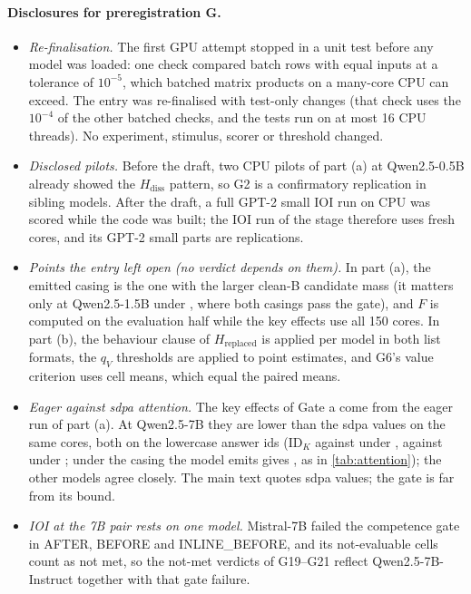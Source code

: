 \paragraph{Disclosures for preregistration G.}
\begin{itemize}\setlength\itemsep{1pt}
  \item \emph{Re-finalisation.} The first GPU attempt stopped in a unit test before any model was loaded: one check compared batch rows with equal inputs at a tolerance of $10^{-5}$, which batched matrix products on a many-core CPU can exceed. The entry was re-finalised with test-only changes (that check uses the $10^{-4}$ of the other batched checks, and the tests run on at most 16 CPU threads). No experiment, stimulus, scorer or threshold changed.
  \item \emph{Disclosed pilots.} Before the draft, two CPU pilots of part (a) at Qwen2.5-0.5B already showed the $H_{\mathrm{diss}}$ pattern, so G2 is a confirmatory replication in sibling models. After the draft, a full GPT-2 small IOI run on CPU was scored while the code was built; the IOI run of the stage therefore uses fresh cores, and its GPT-2 small parts are replications.
  \item \emph{Points the entry left open (no verdict depends on them).} In part (a), the emitted casing is the one with the larger clean-B candidate mass (it matters only at Qwen2.5-1.5B under \fmtPost{}, where both casings pass the gate), and $F$ is computed on the evaluation half while the key effects use all 150 cores. In part (b), the behaviour clause of $H_{\mathrm{replaced}}$ is applied per model in both list formats, the $q_V$ thresholds are applied to point estimates, and G6's value criterion uses cell means, which equal the paired means.
  \item \emph{Eager against sdpa attention.} The key effects of Gate a come from the eager run of part (a). At Qwen2.5-7B they are lower than the sdpa values on the same cores, both on the lowercase answer ids ($\mathrm{ID}_K$ \GaIDKLowPostQwenSeven{} against \GaSdpaIDKPostQwenSeven{} under \fmtPost{}, \GaIDKLowOptQwenSeven{} against \GaSdpaIDKOptQwenSeven{} under \fmtOpt{}; under \fmtPost{} the casing the model emits gives \GaIDKCapPostQwenSeven{}, as in \cref{tab:attention}); the other models agree closely. The main text quotes sdpa values; the gate is far from its bound.
  \item \emph{IOI at the 7B pair rests on one model.} Mistral-7B failed the competence gate in AFTER, BEFORE and INLINE\_BEFORE, and its not-evaluable cells count as not met, so the not-met verdicts of G19--G21 reflect Qwen2.5-7B-Instruct together with that gate failure.

\end{itemize}
